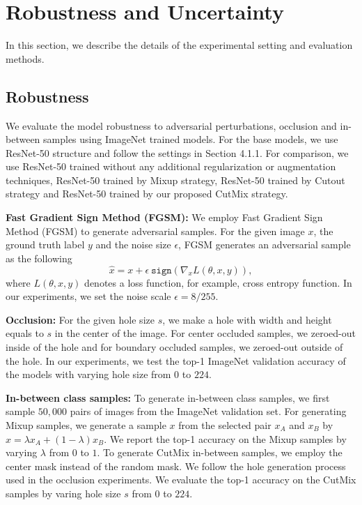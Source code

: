 \section{Robustness and Uncertainty}
\label{appendix:robustness}

In this section, we describe the details of the experimental setting and evaluation methods.

\subsection{Robustness}

We evaluate the model robustness to adversarial perturbations, occlusion and in-between samples using ImageNet trained models. For the base models, we use ResNet-50 structure and follow the settings in Section 4.1.1.
For comparison, we use ResNet-50 trained without any additional regularization or augmentation techniques, ResNet-50 trained by Mixup strategy, ResNet-50 trained by Cutout strategy and ResNet-50 trained by our proposed CutMix strategy.

\noindent\textbf{Fast Gradient Sign Method (FGSM): }
We employ Fast Gradient Sign Method (FGSM) \cite{fgsm} to generate adversarial samples.
For the given image $x$, the ground truth label $y$ and the noise size $\epsilon$, FGSM generates an adversarial sample as the following
\begin{equation}
    \hat x = x + \epsilon ~\texttt{sign}\left(\nabla_{x} L(\theta, x, y)\right),
\end{equation}
where $L(\theta, x, y)$ denotes a loss function, for example, cross entropy function.
In our experiments, we set the noise scale $\epsilon = 8/255$.

\noindent\textbf{Occlusion: }
For the given hole size $s$, we make a hole with width and height equals to $s$ in the center of the image.
For center occluded samples, we zeroed-out inside of the hole and for boundary occluded samples, we zeroed-out outside of the hole.
In our experiments, we test the top-1 ImageNet validation accuracy of the models with varying hole size from $0$ to $224$.

\noindent\textbf{In-between class samples: }
To generate in-between class samples, we first sample $50,000$ pairs of images from the ImageNet validation set. For generating Mixup samples, we generate a sample $x$ from the selected pair $x_A$ and $x_B$ by $x = \lambda x_A + (1-\lambda) x_B$. We report the top-1 accuracy on the Mixup samples by varying $\lambda$ from $0$ to $1$.
To generate CutMix in-between samples, we employ the center mask instead of the random mask. We follow the hole generation process used in the occlusion experiments. We evaluate the top-1 accuracy on the CutMix samples by varing hole size $s$ from $0$ to $224$.

